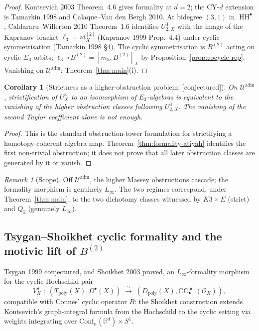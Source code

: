 \documentclass[11pt,reqno]{amsart}
\theoremstyle{plain}
\newtheorem{corollary}[theorem]{Corollary}
\theoremstyle{definition}
\theoremstyle{remark}
\newtheorem{remark}[theorem]{Remark}
\providecommand{\ClaimStatusConjectured}{\textnormal{[conjectured]}}
\DeclareMathOperator{\HH}{HH}
\newcommand{\Rbb}{\mathbb{R}}
\newcommand{\cU}{\mathcal{U}}
\newcommand{\cO}{\mathcal{O}}
\newcommand{\at}{\mathrm{at}}
\begin{document}
\begin{proof}
Kontsevich 2003 Theorem~4.6 gives formality at $d = 2$; the CY-$d$ extension is Tamarkin 1998 and Calaque--Van den Bergh 2010. At bidegree $(3, 1)$ in $\HH^\bullet$, Caldararu--Willerton 2010 Theorem~1.6 identifies $U^3_{2,X}$ with the image of the Kapranov bracket $\ell_3 = \at_X^{[2]}$ (Kapranov 1999 Prop.~4.4) under cyclic-symmetrisation (Tamarkin 1998 \S4). The cyclic symmetrisation is $B^{(2)}$ acting on cyclic-$\Sigma_3$-orbits; $\ell_3 \circ B^{(2)} = [m_3, B^{(2)}]_X$ by Proposition~\ref{prop:cocycle-rep}. Vanishing on $\cU^{\mathrm{adm}}$: Theorem~\ref{thm:main}(i).
\end{proof}

\begin{corollary}[Strictness as a higher-obstruction problem; \ClaimStatusConjectured]
\label{cor:strict-formality}
On $\cU^{\mathrm{adm}}$, strictification of $U^3_X$ to an isomorphism
of $E_3$-algebras is equivalent to the vanishing of the higher
obstruction classes following $U^3_{2,X}$. The vanishing of the second
Taylor coefficient alone is not enough.
\end{corollary}

\begin{proof}
This is the standard obstruction-tower formulation for strictifying a
homotopy-coherent algebra map. Theorem~\ref{thm:formality-atiyah}
identifies the first non-trivial obstruction; it does not prove that
all later obstruction classes are generated by it or vanish.
\end{proof}

\begin{remark}[Scope]
Off $\cU^{\mathrm{adm}}$, the higher Massey obstructions cascade; the formality morphism is genuinely $L_\infty$. The two regimes correspond, under Theorem~\ref{thm:main}, to the two dichotomy classes witnessed by $K3 \times E$ (strict) and $Q_5$ (genuinely $L_\infty$).
\end{remark}

\subsection{Tsygan--Shoikhet cyclic formality and the motivic lift of $B^{(2)}$}
\label{sub:tsygan-formality}
Tsygan 1999 conjectured, and Shoikhet 2003 proved, an $L_\infty$-formality morphism for the cyclic-Hochschild pair
\[
  V^d_X \;:\; (T_{\mathrm{poly}}(X), \Omega^\bullet(X)) \;\xrightarrow{\sim}\; (D_{\mathrm{poly}}(X), \mathrm{CC}^{\mathrm{per}}_\bullet(\cO_X)),
\]
compatible with Connes' cyclic operator $B$: the Shoikhet construction extends Kontsevich's graph-integral formula from the Hochschild to the cyclic setting via weights integrating over $\mathrm{Conf}_n(\Rbb^d) \times S^1$.
\end{document}
